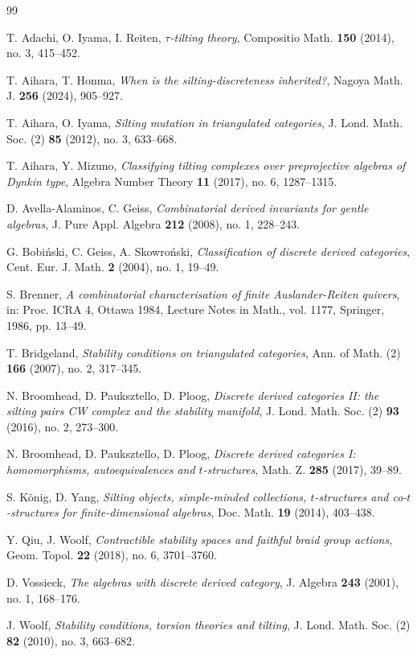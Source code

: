 \documentclass[11pt, a4paper]{article}
\theoremstyle{definition}
\def\ss{ss}%
\begin{document}
\begin{thebibliography}{99}

T. Adachi, O. Iyama, I. Reiten,
\emph{$\tau$-tilting theory},
Compositio Math. \textbf{150} (2014), no. 3, 415--452.

T. Aihara, T. Honma,
\emph{When is the silting-discreteness inherited?},
Nagoya Math. J. \textbf{256} (2024), 905--927.

T. Aihara, O. Iyama,
\emph{Silting mutation in triangulated categories},
J. Lond. Math. Soc. (2) \textbf{85} (2012), no. 3, 633--668.

T. Aihara, Y. Mizuno,
\emph{Classifying tilting complexes over preprojective algebras of Dynkin type},
Algebra Number Theory \textbf{11} (2017), no. 6, 1287--1315.

D. Avella-Alaminos, C. Gei\ss{},
\emph{Combinatorial derived invariants for gentle algebras},
J. Pure Appl. Algebra \textbf{212} (2008), no. 1, 228--243.

G. Bobi\'nski, C. Gei\ss{}, A. Skowro\'nski,
\emph{Classification of discrete derived categories},
Cent. Eur. J. Math. \textbf{2} (2004), no. 1, 19--49.

S. Brenner,
\emph{A combinatorial characterisation of finite Auslander-Reiten quivers},
in: Proc. ICRA 4, Ottawa 1984, Lecture Notes in Math., vol. 1177, Springer, 1986, pp. 13--49.

T. Bridgeland,
\emph{Stability conditions on triangulated categories},
Ann. of Math. (2) \textbf{166} (2007), no. 2, 317--345.

N. Broomhead, D. Pauksztello, D. Ploog,
\emph{Discrete derived categories II: the silting pairs CW complex and the stability manifold},
J. Lond. Math. Soc. (2) \textbf{93} (2016), no. 2, 273--300.

N. Broomhead, D. Pauksztello, D. Ploog,
\emph{Discrete derived categories I: homomorphisms, autoequivalences and $t$-structures},
Math. Z. \textbf{285} (2017), 39--89.

S. K\"onig, D. Yang,
\emph{Silting objects, simple-minded collections, $t$-structures and co-$t$-structures for finite-dimensional algebras},
Doc. Math. \textbf{19} (2014), 403--438.

Y. Qiu, J. Woolf,
\emph{Contractible stability spaces and faithful braid group actions},
Geom. Topol. \textbf{22} (2018), no. 6, 3701--3760.

D. Vossieck,
\emph{The algebras with discrete derived category},
J. Algebra \textbf{243} (2001), no. 1, 168--176.

J. Woolf,
\emph{Stability conditions, torsion theories and tilting},
J. Lond. Math. Soc. (2) \textbf{82} (2010), no. 3, 663--682.

\end{thebibliography}
\end{document}
